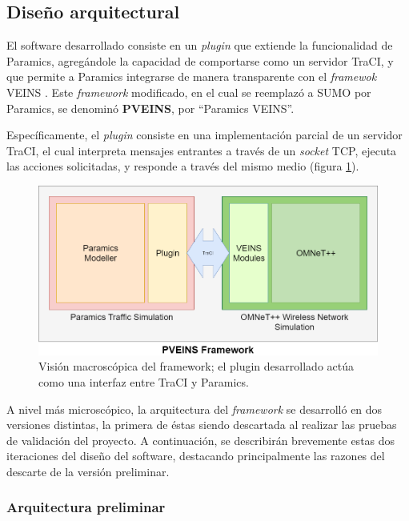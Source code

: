 \subsection{Diseño arquitectural}\label{sec:architecture}

El software desarrollado consiste en un \emph{plugin} que extiende la funcionalidad de Paramics, agregándole la capacidad de comportarse como un servidor TraCI, y que permite a Paramics integrarse de manera transparente con el \emph{framewok} VEINS \autocite{sommer_german_dressler}. Este \emph{framework} modificado, en el cual se reemplazó a SUMO por Paramics, se denominó \textbf{PVEINS}, por ``Paramics VEINS''. 

Específicamente, el \emph{plugin} consiste en una implementación parcial de un servidor TraCI, el cual interpreta mensajes entrantes a través de un \emph{socket} TCP, ejecuta las acciones solicitadas, y responde a través del mismo medio (figura \ref{fig:pveins_genarch}).

\begin{figure}[h]
    \centering
    \includegraphics[width=\linewidth]{figuras/PVEINSArch.png}
    \caption[Visión macroscópica del framework]{Visión macroscópica del framework; el plugin desarrollado actúa como una interfaz entre TraCI y Paramics.}
    \label{fig:pveins_genarch}
\end{figure}

A nivel más microscópico, la arquitectura del \emph{framework} se desarrolló en dos versiones distintas, la primera de éstas siendo descartada al realizar las pruebas de validación del proyecto. A continuación, se describirán brevemente estas dos iteraciones del diseño del software, destacando principalmente las razones del descarte de la versión preliminar.

\subsubsection{Arquitectura preliminar}

